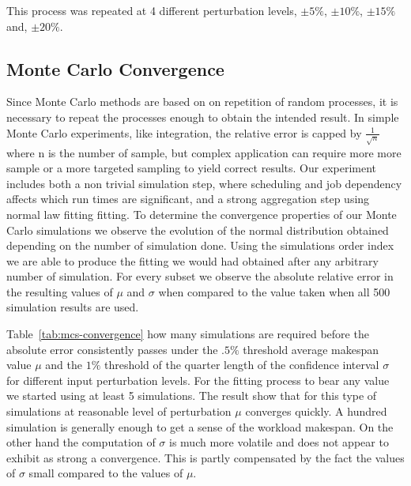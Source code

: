\documentclass[10pt,conference,compsocconf]{IEEEtran}
\newcommand{\pmpc}[1]{$\pm#1\%$}
\begin{document}
This process was repeated at 4 different perturbation levels, \pmpc{5},
\pmpc{10}, \pmpc{15} and, \pmpc{20}.

\subsection{Monte Carlo Convergence}

Since Monte Carlo methods are based on on repetition of random processes, it is
necessary to repeat the processes enough to obtain the intended result. In
simple Monte Carlo experiments, like integration, the relative error is capped
by $\frac{1}{\sqrt{n}}$ where n is the number of sample, but complex application
can require more more sample or a more targeted sampling to yield correct
results. Our experiment includes both a non trivial simulation step, where
scheduling and job dependency affects which run times are significant, and a
strong aggregation step using normal law fitting fitting. To determine the
convergence properties of our Monte Carlo simulations we observe the evolution
of the normal distribution obtained depending on the number of simulation done. 
Using the simulations order index we are able to produce the fitting we would
had obtained after any arbitrary number of simulation. For every subset we
observe the absolute relative error in the resulting values of $\mu$ and $\sigma$ 
when compared to the value taken when all 500 simulation results are used. 

Table~\ref{tab:mcs-convergence} how many simulations are required before the
absolute error consistently passes under the $.5\%$ threshold average makespan
value $\mu$ and the $1\%$ threshold of the quarter length of the confidence
interval $\sigma$ for different input perturbation levels. For the fitting
process to bear any value we started using at least 5 simulations. The result
show that for this type of simulations at reasonable level of perturbation $\mu$
converges quickly. A hundred simulation is generally enough to get a sense of
the workload makespan. On the other hand the computation of $\sigma$ is much
more volatile and does not appear to exhibit  as strong a convergence. This is
partly compensated by the fact the values of $\sigma$ small compared to the
values of $\mu$.
\end{document}
